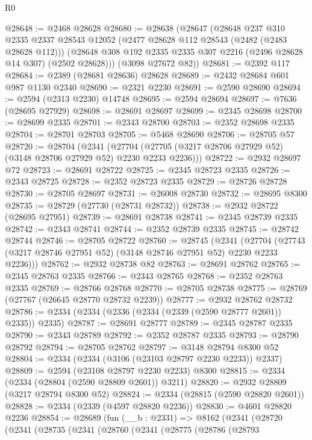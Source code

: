\begin{lexlean}{R0}
\begin{coremodule}
@28648 := @2468 @28628
@28680 := @28638
    (@28647
      (@28648
        @237
        @310
        @2335
        @2337
        @28543
        @12052
        (@2477 @28628 @112 @28543 (@2482 (@2483 @28628 @112)))
        (@28648 @308 @192 @2335 @2335 @307 @2216 (@2496 @28628 @14 @307) (@2502 @28628)))
      (@3098 @27672 @82))
@28681 := @2392 @117
@28684 := @2389 (@28681 @28636) @28628
@28689 := @2432 @28684 @601 @987 @1130 @2340
@28690 := @2321 @2230
@28691 := @2590 @28690
@28694 := @2594 (@2313 @2230) @14748
@28695 := @2594 @28694
@28697 := @7636 (@28695 @27929)
@28698 := @28691 @28697
@28699 := @2345 @28698
@28700 := @28699 @2335
@28701 := @2343 @28700
@28703 := @2352 @28698 @2335
@28704 := @28701 @28703
@28705 := @5468 @28690
@28706 := @28705 @57
@28720 := @28704
    (@2341 (@27704 (@27705 (@3217 @28706 @27929 @52) (@3148 @28706 @27929 @52) @2230 @2233 @2236)))
@28722 := @2932 @28697 @72
@28723 := @28691 @28722
@28725 := @2345 @28723 @2335
@28726 := @2343 @28725
@28728 := @2352 @28723 @2335
@28729 := @28726 @28728
@28730 := @28705 @28697
@28731 := @26008 @28730
@28732 := @28695 @8300
@28735 := @28729 (@27730 (@28731 @28732))
@28738 := @2932 @28722 (@28695 @27951)
@28739 := @28691 @28738
@28741 := @2345 @28739 @2335
@28742 := @2343 @28741
@28744 := @2352 @28739 @2335
@28745 := @28742 @28744
@28746 := @28705 @28722
@28760 := @28745
    (@2341 (@27704 (@27743 (@3217 @28746 @27951 @52) (@3148 @28746 @27951 @52) @2230 @2233 @2236)))
@28762 := @2932 @28738 @82
@28763 := @28691 @28762
@28765 := @2345 @28763 @2335
@28766 := @2343 @28765
@28768 := @2352 @28763 @2335
@28769 := @28766 @28768
@28770 := @28705 @28738
@28775 := @28769 (@27767 (@26645 @28770 @28732 @2239))
@28777 := @2932 @28762 @28732
@28786 := @2334 (@2334 (@2336 (@2334 (@2339 (@2590 @28777 @2601)) @2335)) @2335)
@28787 := @28691 @28777
@28789 := @2345 @28787 @2335
@28790 := @2343 @28789
@28792 := @2352 @28787 @2335
@28793 := @28790 @28792
@28794 := @28705 @28762
@28797 := @3148 @28794 @8300 @52
@28804 := @2334 (@2334 (@3106 (@23103 @28797 @2230 @2233)) @2337)
@28809 := @2594 (@23108 @28797 @2230 @2233) @8300
@28815 := @2334 (@2334 (@28804 (@2590 @28809 @2601)) @3211)
@28820 := @2932 @28809 (@3217 @28794 @8300 @52)
@28824 := @2334 (@28815 (@2590 @28820 @2601))
@28828 := @2334 (@2339 (@4597 @28820 @2236))
@28830 := @4601 @28820 @2236
@28854 := @28689
    (fun (__b : @2331) =>
    @8162
      (@2341
        (@28720
          (@2341
            (@28735
              (@2341
                (@28760
                  (@2341
                    (@28775
                      (@28786
                        (@28793

\end{coremodule}
\end{lexlean}
